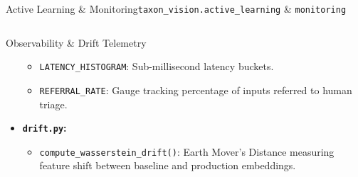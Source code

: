 \begin{frame}{Active Learning \& Monitoring}{\texttt{taxon\_vision.active\_learning} \& \texttt{monitoring}}
\begin{columns}[T]
\begin{column}{0.48\textwidth}
\begin{block}{Observability \& Drift Telemetry}
\begin{itemize}
\begin{itemize}
                            \item \texttt{LATENCY\_HISTOGRAM}: Sub-millisecond latency buckets.
                            \item \texttt{REFERRAL\_RATE}: Gauge tracking percentage of inputs referred to human triage.
                        \end{itemize}
                    \item \textbf{\texttt{drift.py}:}
                        \begin{itemize}\tiny
                            \item \texttt{compute\_wasserstein\_drift()}: Earth Mover's Distance measuring feature shift between baseline and production embeddings.
                        \end{itemize}
                \end{itemize}
            \end{block}
        \end{column}
    \end{columns}


\end{frame}

